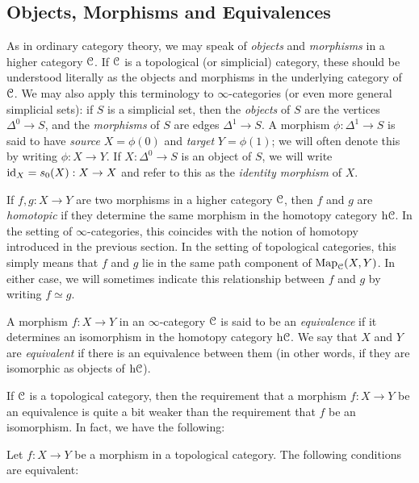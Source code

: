 \subsection{Objects, Morphisms and Equivalences}\label{obmor}
\begin{Didn't Read}

As in ordinary category theory, we may speak of {\it objects} and {\it morphisms} in a higher category $\operatorname{\mathcal{C}}$. If $\operatorname{\mathcal{C}}$ is a topological (or simplicial) category, these
should be understood literally as the objects and morphisms in the
underlying category of $\operatorname{\mathcal{C}}$. We may also apply this terminology
to $\infty$-categories (or even more general simplicial sets): if $S$ is a simplicial set, then the {\it
objects} of $S$ are the vertices $\Delta^0 \rightarrow S$, and the {\it morphisms}
of $S$ are edges $\Delta^1 \rightarrow S$. A morphism $\phi: \Delta^1 \rightarrow S$ is said to have {\it source} $X= \phi(0)$ and {\it target} $Y= \phi(1)$;
we will often denote this by writing $\phi: X \rightarrow Y$.
If $X: \Delta^0 \rightarrow S$ is an object of $S$, we will write
$\operatorname{id}_X = s_0(X): X \rightarrow X$ and refer to this as the {\it identity morphism} of $X$.

If $f,g: X \rightarrow Y$ are two morphisms in a higher category $\operatorname{\mathcal{C}}$, then $f$ and $g$
are {\it homotopic} if they determine the same morphism in the homotopy category $\rm{h} \it{\operatorname{\mathcal{C}}}$. In the setting of $\infty$-categories, this coincides with the notion of homotopy introduced in the previous section. In the setting of
topological categories, this simply means that $f$ and $g$ lie
in the same path component of $\operatorname{{Map}}_{\operatorname{\mathcal{C}}}(X,Y)$. In either case,
we will sometimes indicate this relationship between $f$ and $g$ by writing $f
\simeq g$.

A morphism $f: X \rightarrow Y$ in an $\infty$-category $\operatorname{\mathcal{C}}$ is
said to be an {\it equivalence} if it determines an isomorphism in the homotopy category
$\rm{h} \it{\operatorname{\mathcal{C}}}$. We say that $X$ and $Y$ are {\it equivalent} if there is
an equivalence between them (in other words, if they are
isomorphic as objects of $\rm{h} \it{\operatorname{\mathcal{C}}}$).

If $\operatorname{\mathcal{C}}$ is a topological category, then the
requirement that a morphism $f: X \rightarrow Y$ be an equivalence
is quite a bit weaker than the requirement that $f$ be an
isomorphism. In fact, we have the following:

\begin{proposition}\label{rooot}
Let $f: X \rightarrow Y$ be a morphism in a topological category.
The following conditions are equivalent:


\end{proposition}
\end{Didn't Read}
